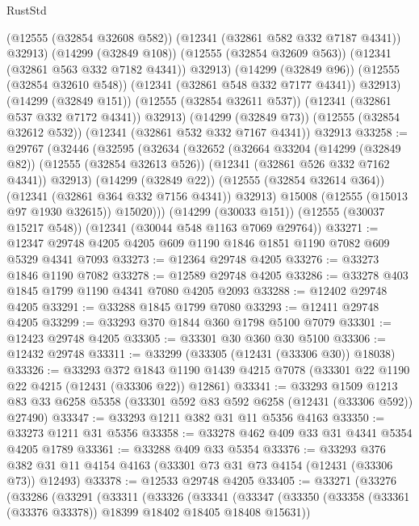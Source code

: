 \begin{lexlean}{RustStd}
\begin{coremodule}
            (@12555 (@32854 @32608 @582))
            (@12341 (@32861 @582 @332 @7187 @4341))
            @32913)
          (@14299 (@32849 @108))
          (@12555 (@32854 @32609 @563))
          (@12341 (@32861 @563 @332 @7182 @4341))
          @32913)
        (@14299 (@32849 @96))
        (@12555 (@32854 @32610 @548))
        (@12341 (@32861 @548 @332 @7177 @4341))
        @32913)
      (@14299 (@32849 @151))
      (@12555 (@32854 @32611 @537))
      (@12341 (@32861 @537 @332 @7172 @4341))
      @32913)
    (@14299 (@32849 @73))
    (@12555 (@32854 @32612 @532))
    (@12341 (@32861 @532 @332 @7167 @4341))
    @32913
@33258 := @29767
    (@32446
      (@32595
        (@32634
          (@32652
            (@32664
              @33204
              (@14299 (@32849 @82))
              (@12555 (@32854 @32613 @526))
              (@12341 (@32861 @526 @332 @7162 @4341))
              @32913)
            (@14299 (@32849 @22))
            (@12555 (@32854 @32614 @364))
            (@12341 (@32861 @364 @332 @7156 @4341))
            @32913)
          @15008
          (@12555 (@15013 @97 @1930 @32615))
          @15020)))
    (@14299 (@30033 @151))
    (@12555 (@30037 @15217 @548))
    (@12341 (@30044 @548 @1163 @7069 @29764))
@33271 := @12347 @29748 @4205 @4205 @609 @1190 @1846 @1851 @1190 @7082 @609 @5329 @4341 @7093
@33273 := @12364 @29748 @4205
@33276 := @33273 @1846 @1190 @7082
@33278 := @12589 @29748 @4205
@33286 := @33278 @403 @1845 @1799 @1190 @4341 @7080 @4205 @2093
@33288 := @12402 @29748 @4205
@33291 := @33288 @1845 @1799 @7080
@33293 := @12411 @29748 @4205
@33299 := @33293 @370 @1844 @360 @1798 @5100 @7079
@33301 := @12423 @29748 @4205
@33305 := @33301 @30 @360 @30 @5100
@33306 := @12432 @29748
@33311 := @33299 (@33305 (@12431 (@33306 @30)) @18038)
@33326 := @33293
    @372
    @1843
    @1190
    @1439
    @4215
    @7078
    (@33301 @22 @1190 @22 @4215 (@12431 (@33306 @22)) @12861)
@33341 := @33293
    @1509
    @1213
    @83
    @33
    @6258
    @5358
    (@33301 @592 @83 @592 @6258 (@12431 (@33306 @592)) @27490)
@33347 := @33293 @1211 @382 @31 @11 @5356 @4163
@33350 := @33273 @1211 @31 @5356
@33358 := @33278 @462 @409 @33 @31 @4341 @5354 @4205 @1789
@33361 := @33288 @409 @33 @5354
@33376 := @33293
    @376
    @382
    @31
    @11
    @4154
    @4163
    (@33301 @73 @31 @73 @4154 (@12431 (@33306 @73)) @12493)
@33378 := @12533 @29748 @4205
@33405 := @33271
    (@33276
      (@33286
        (@33291
          (@33311
            (@33326
              (@33341
                (@33347
                  (@33350 (@33358 (@33361 (@33376 @33378)) @18399 @18402 @18405 @18408 @15631))

\end{coremodule}
\end{lexlean}
